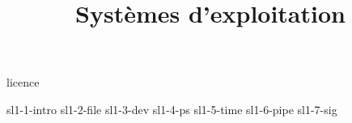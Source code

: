 \documentclass [xcolor=table] {beamer}
\title {Systèmes d'exploitation}
\begin{document}

 {licence}

 {sl1-1-intro}
 {sl1-2-file}
 {sl1-3-dev}
 {sl1-4-ps}
 {sl1-5-time}
 {sl1-6-pipe}
 {sl1-7-sig}
\end{document}
